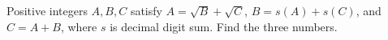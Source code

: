 Positive integers $A,B,C$ satisfy $A=\sqrt B+\sqrt C$, $B=s(A)+s(C)$, and $C=A+B$, where $s$ is decimal digit sum. Find the three numbers.
